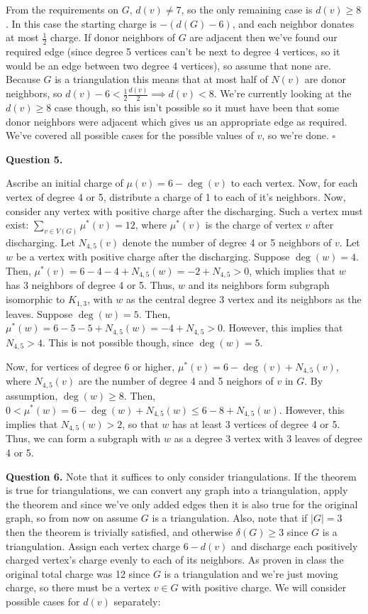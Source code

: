 \documentclass[letterpaper, reqno,11pt]{article}
\begin{document}
From the requirements on $G$, $d(v)\neq 7$, so the only remaining case is $d(v)\geq 8$. In this case the starting charge is $-(d(G)-6)$, and each neighbor donates at most $\frac{1}{2}$ charge. If donor neighbors of $G$ are adjacent then we've found our required edge (since degree 5 vertices can't be next to degree 4 vertices, so it would be an edge between two degree 4 vertices), so assume that none are. Because $G$ is a triangulation this means that at most half of $N(v)$ are donor neighbors, so $d(v)-6 < \frac{1}{2}\frac{d(v)}{2}\implies d(v)<8$. We're currently looking at the $d(v)\geq 8$ case though, so this isn't possible so it must have been that some donor neighbors were adjacent which gives us an appropriate edge as required. We've covered all possible cases for the possible values of $v$, so we're done. $\square$

{\medskip\noindent\bf Question 5.} 

Ascribe an initial charge of $\mu(v) = 6 - \deg(v)$ to each vertex. Now, for each vertex of degree 4 or 5, distribute a charge of 1 to each of it's neighbors. Now, consider any vertex with positive charge after the discharging. Such a vertex must exist: $\sum_{v\in V(G)} \mu^{*}(v) = 12$, where $\mu^{*}(v)$ is the charge of vertex $v$ after discharging. 
Let $N_{4, 5 }(v)$ denote the number of degree 4 or 5 neighbors of $v$. 
Let $w$ be a vertex with positive charge after the discharging. Suppose $\deg(w) = 4$. Then, $\mu^{*}(v) = 6 - 4 - 4 + N_{4, 5}(w) = -2 + N_{4, 5} > 0$, which implies that $w$ has 3 neighbors of degree 4 or 5. Thus, $w$ and its neighbors form subgraph isomorphic to $K_{1,3}$, with $w$ as the central degree 3 vertex and its neighbors as the leaves.
Suppose $\deg(w) = 5$. Then, $\mu^{*}(w) = 6 - 5 - 5 + N_{4, 5}(w) = -4 + N_{4, 5} > 0$. However, this implies that $N_{4, 5} > 4$. This is not possible though, since $\deg(w) = 5$.

Now, for vertices of degree 6 or higher, $\mu^{*}(v) = 6- \deg(v) + N_{4, 5}(v)$, where $N_{4, 5}(v)$ are the number of degree 4 and 5 neighors of $v$ in $G$. By assumption, $\deg(w) \geq 8$. Then, $0 < \mu^{*}(w) = 6 - \deg(w) + N_{4, 5}(w) \leq 6 - 8 + N_{4, 5}(w)$. However, this implies that $N_{4,5}(w) > 2$, so that $w$ has at least 3 vertices of degree 4 or 5. Thus, we can form a subgraph with $w$ as a degree 3 vertex with 3 leaves of degree 4 or 5.

{\medskip\noindent\bf Question 6.} Note that it suffices to only consider triangulations. If the theorem is true for triangulations, we can convert any graph into a triangulation, apply the theorem and since we've only added edges then it is also true for the original graph, so from now on assume $G$ is a triangulation. Also, note that if $|G|=3$ then the theorem is trivially satisfied, and otherwise $\delta(G)\geq 3$ since $G$ is a triangulation. Assign each vertex charge $6-d(v)$ and discharge each positively charged vertex's charge evenly to each of its neighbors. As proven in class the original total charge was 12 since $G$ is a triangulation and we're just moving charge, so there must be a vertex $v\in G$ with positive charge. We will consider possible cases for $d(v)$ separately: 
\end{document}
